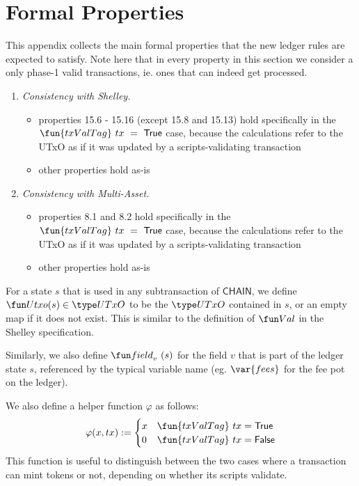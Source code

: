 \section{Formal Properties}
\label{sec:properties}

This appendix collects the main formal properties that the new ledger rules are expected to satisfy.
Note here that in every property in this section we consider a only phase-1 valid
transactions, ie. ones that can indeed get processed.

\begin{enumerate}[label=P{\arabic*}:\ ]
\item
  \emph{Consistency with Shelley.}
  \begin{itemize}
    \item properties 15.6 - 15.16 (except 15.8 and 15.13) hold specifically in the $\fun{txValTag}~tx~=~\True$ case, because
    the calculations refer to the UTxO as if it was updated by a scripts-validating transaction
    \item other properties hold as-is
  \end{itemize}

\item
  \emph{Consistency with Multi-Asset.}
  \begin{itemize}
    \item properties 8.1 and 8.2 hold specifically in the $\fun{txValTag}~tx~=~\True$ case, because
    the calculations refer to the UTxO as if it was updated by a scripts-validating transaction
    \item other properties hold as-is
  \end{itemize}
\end{enumerate}


\begin{definition}
  For a state $s$ that is used in any subtransaction of
  $\mathsf{CHAIN}$, we define $\Utxo(s) \in \UTxO$ to be the $\UTxO$
  contained in $s$, or an empty map if it does not exist. This is
  similar to the definition of $\Val$ in the Shelley specification.

  Similarly, we also define $\field_{v}~(s)$ for the field $v$ that is part of
  the ledger state $s$, referenced by the typical variable name (eg. $\var{fees}$
  for the fee pot on the ledger).
\end{definition}

We also define a helper function $\varphi$ as follows:
\[\varphi(x, tx) :=
  \begin{cases}
    x & \fun{txValTag}~tx = \True \\
    0 & \fun{txValTag}~tx = \False
  \end{cases}\]
This function is useful to distinguish between the two
cases where a transaction can mint tokens or not, depending on whether
its scripts validate.

